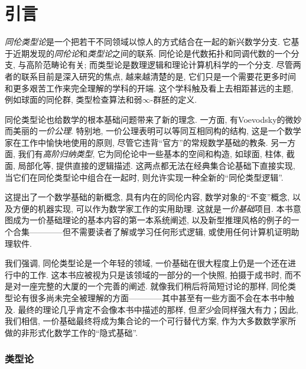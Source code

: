 \chapter*{引言}
\setcounter{page}{1}


\emph{同伦类型论}是一个把若干不同领域以惊人的方式结合在一起的新兴数学分支. 它基于近期发现的\emph{同伦论}和\emph{类型论}之间的联系. 
同伦论是代数拓扑和同调代数的一个分支, 与高阶范畴论有关; 而类型论是数理逻辑和理论计算机科学的一个分支. 
尽管两者的联系目前是深入研究的焦点, 越来越清楚的是, 它们只是一个需要花更多时间和更多艰苦工作来完全理解的学科的开端. 
这个学科触及看上去相距甚远的主题, 例如球面的同伦群, 类型检查算法和弱$\infty$-群胚的定义. 

同伦类型论也给数学的根本基础问题带来了新的理念. 
%
一方面, 有Voevodsky的微妙而美丽的\emph{一价公理}. 
%
特别地, 一价公理表明可以等同互相同构的结构, 这是一个数学家在工作中愉快地使用的原则, 尽管它违背``官方''的常规数学基础的教条.
另一方面, 我们有\emph{高阶归纳类型}, 它为同伦论中一些基本的空间和构造, 如球面, 柱体, 截面, 局部化等, 提供直接的逻辑描述. 这两点都无法在经典集合论基础下直接实现, 当它们在同伦类型论中组合在一起时, 则允许实现一种全新的``同伦类型逻辑''.
%

这提出了一个数学基础的新概念, 具有内在的同伦内容, 数学对象的``不变''概念, 以及方便的机器实现, 可以作为数学家工作的实用助理. 
这就是\emph{一价基础}项目. 本书意图成为一价基础理论的基本内容的第一本系统阐述, 以及新型推理风格的例子的一个合集————但不需要读者了解或学习任何形式逻辑, 或使用任何计算机证明助理软件. 

\OPTwidow

我们强调, 同伦类型论是一个年轻的领域, 一价基础在很大程度上仍是一个还在进行中的工作. 
这本书应被视为只是该领域的一部分的一个快照, 拍摄于成书时, 而不是对一座完整的大厦的一个完善的阐述. 
就像我们稍后将简短讨论的那样, 同伦类型论有很多尚未完全被理解的方面————其中甚至有一些方面不会在本书中触及. 
最终的理论几乎肯定不会像本书中描述的那样, 但\emph{至少}会同样强大有力；因此, 我们相信, 一价基础最终将成为集合论的一个可行替代方案, 作为大多数数学家所做的非形式化数学工作的``隐式基础''. 

\subsection*{类型论}


